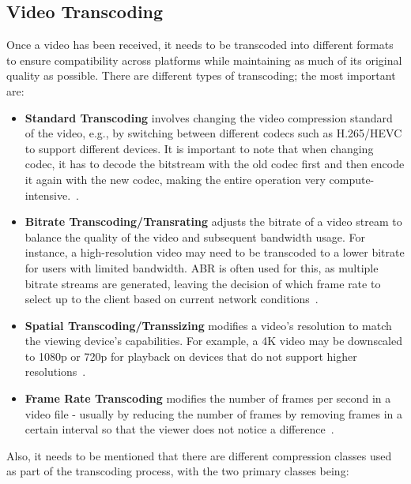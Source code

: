 \subsection{Video Transcoding}
Once a video has been received, it needs to be transcoded into different formats to ensure compatibility across platforms while maintaining as much of its original quality as possible. There are different types of transcoding; the most important are:

\begin{itemize}
    \item \textbf{Standard Transcoding} involves changing the video compression standard of the video, e.g., by switching between different codecs such as H.265/HEVC to support different devices. It is important to note that when changing codec, it has to decode the bitstream with the old codec first and then encode it again with the new codec, making the entire operation very compute-intensive.~\parencite{codec_transcoding}.
    \item \textbf{Bitrate Transcoding/Transrating} adjusts the bitrate of a video stream to balance the quality of the video and subsequent bandwidth usage. For instance, a high-resolution video may need to be transcoded to a lower bitrate for users with limited bandwidth. \ac{ABR} is often used for this, as multiple bitrate streams are generated, leaving the decision of which frame rate to select up to the client based on current network conditions~\parencite{transcoding}.
    \item \textbf{Spatial Transcoding/Transsizing} modifies a video's resolution to match the viewing device's capabilities. For example, a 4K video may be downscaled to 1080p or 720p for playback on devices that do not support higher resolutions~\parencite{cloud_streaming}.
    \item \textbf{Frame Rate Transcoding} modifies the number of frames per second in a video file - usually by reducing the number of frames by removing frames in a certain interval so that the viewer does not notice a difference~\parencite{transcoding}.
\end{itemize}

Also, it needs to be mentioned that there are different compression classes used as part of the transcoding process, with the two primary classes being:

